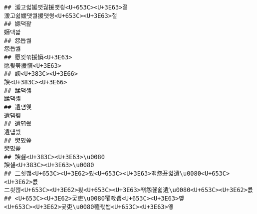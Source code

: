 \documentclass[]{article}
\begin{document}
\begin{verbatim}
## 湲고쉷媛먯궗援먯쑁<U+653C><U+3E63>젙                                                                                                                                                                 湲고쉷媛먯궗援먯쑁<U+653C><U+3E63>젙
## 嫄댁꽕                                                                                                                                                                                                                 嫄댁꽕
## 怨듭궗                                                                                                                                                                                                                 怨듭궗
## 愿묒쭊援愼<U+3E63>                                                                                                                                                                                               愿묒쭊援愼<U+3E63>
## 諛<U+383C><U+3E66>                                                                                                                                                                                                     諛<U+383C><U+3E66>
## 蹂댁셿                                                                                                                                                                                                                 蹂댁셿
## 遺덈웾                                                                                                                                                                                                                 遺덈웾
## 遺덉씠                                                                                                                                                                                                                 遺덉씠
## 臾몄쓽                                                                                                                                                                                                                 臾몄쓽
## 諛섎<U+383C><U+3E63>\u0080                                                                                                                                                                                     諛섎<U+383C><U+3E63>\u0080
## 二쇳깮<U+653C><U+3E62>룄<U+653C><U+3E63>떆怨꾪쉷遺\u0080<U+653C><U+3E62>룞                                                                                                             二쇳깮<U+653C><U+3E62>룄<U+653C><U+3E63>떆怨꾪쉷遺\u0080<U+653C><U+3E62>룞
## <U+653C><U+3E62>궃吏\u0080罹좏봽<U+653C><U+3E63>옣                                                                                                                                                 <U+653C><U+3E62>궃吏\u0080罹좏봽<U+653C><U+3E63>옣

\end{verbatim}
\end{document}
